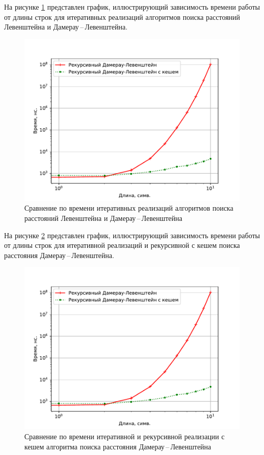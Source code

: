 На рисунке \ref{plt:time_02} представлен график, иллюстрирующий зависимость времени работы от длины строк для итеративных реализаций алгоритмов поиска расстояний Левенштейна и Дамерау\,--\,Левенштейна.
\begin{figure}[H]
	\centering
	\includegraphics[height=0.5\textheight, page=2]{img/figures.pdf}
	\caption{Сравнение по времени итеративных реализаций алгоритмов поиска расстояний Левенштейна и Дамерау\,--\,Левенштейна}
	\label{plt:time_02}
\end{figure}

На рисунке \ref{plt:time_03} представлен график, иллюстрирующий зависимость времени работы от длины строк для итеративной реализаций и рекурсивной с кешем поиска расстояния Дамерау\,--\,Левенштейна. 
\begin{figure}[H]
	\centering
	\includegraphics[height=0.5\textheight, page=3]{img/figures.pdf}
	\caption{Сравнение по времени итеративной и рекурсивной реализации с кешем алгоритма поиска расстояния Дамерау\,--\,Левенштейна}
	\label{plt:time_03}
\end{figure}

